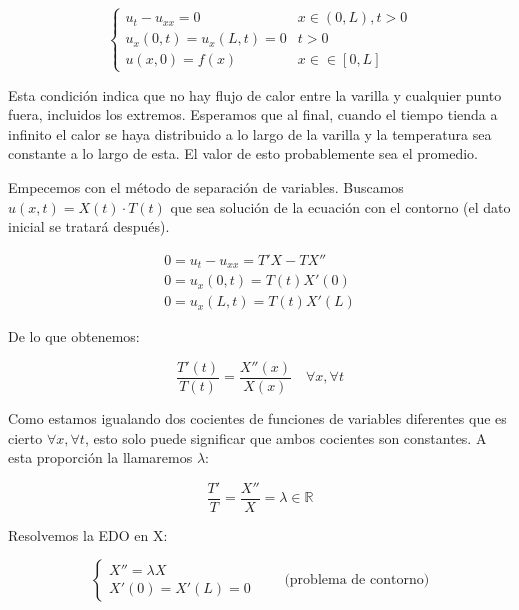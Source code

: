 	\begin{example} 

		\[
		\begin{cases}
		u_t - u_{xx} = 0 & x \in (0,L), t > 0 \\
		u_x(0,t) = u_x(L,t) = 0 & t > 0 \\
		u(x,0) = f(x) & x ∈ \in [0,L]
		\end{cases}
		\]

		Esta condición indica que no hay flujo de calor entre la varilla y cualquier punto fuera, incluidos los extremos. Esperamos que al final, cuando el tiempo tienda a infinito el calor se haya distribuido a lo largo de la varilla y la temperatura sea constante a lo largo de esta. El valor de esto probablemente sea el promedio.

		\begin{figure}[thbp]
		\centering
		\caption{}
		\label{fig:transmisionCalorNeumann}
		\end{figure}

		Empecemos con el método de separación de variables. Buscamos $u(x,t) = X(t) \cdot T(t)$ que sea solución de la ecuación con el contorno (el dato inicial se tratará después).


		\[
		\begin{array}{l}
			0 = u_t - u_{xx} = T' X - T X'' \\
			0 = u_x (0,t) = T(t) X'(0) \\
			0 = u_x (L,t) = T(t) X'(L)
		\end{array}
		\]

		De lo que obtenemos:

		\[ \frac{T'(t)}{T(t)} = \frac{X''(x)}{X(x)} \quad \forall x, \forall t \]

		Como estamos igualando dos cocientes de funciones de variables diferentes que es cierto $\forall x, \forall t$, esto solo puede significar que ambos cocientes son constantes. A esta proporción la llamaremos $\lambda$:

		\[ \frac{T'}{T} = \frac{X''}{X} = \lambda \in \mathbb{R} \]

		Resolvemos la EDO en X:

		\[
		\left\{ \begin{array}{l}
		X'' = \lambda X \\
		X'(0) = X'(L) = 0
		\end{array} \right. \quad\quad \text{(problema de contorno)}
		\]


\end{example}
